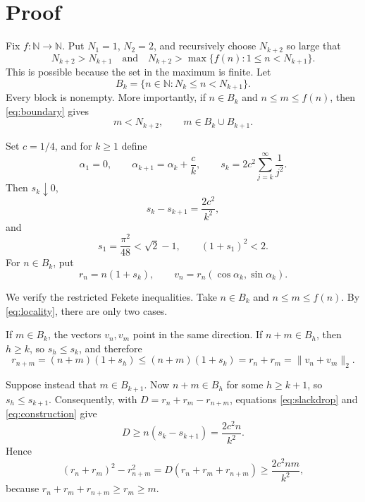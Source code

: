 \documentclass[11pt]{article}
\newcommand{\N}{\mathbb N}
\newcommand{\uu}[1]{(\cos #1,\sin #1)}
\begin{document}
\section*{Proof}

Fix \(f:\N\to\N\).  Put \(N_1=1\), \(N_2=2\), and recursively choose
\(N_{k+2}\) so large that
\begin{equation}\label{eq:boundary}
 N_{k+2}>N_{k+1}
 \quad\text{and}\quad
 N_{k+2}>\max\{f(n):1\leq n<N_{k+1}\}.
\end{equation}
This is possible because the set in the maximum is finite.  Let
\[
 B_k=\{n\in\N:N_k\leq n<N_{k+1}\}.
\]
Every block is nonempty.  More importantly, if \(n\in B_k\) and
\(n\leq m\leq f(n)\), then \eqref{eq:boundary} gives
\begin{equation}\label{eq:locality}
                  m<N_{k+2},\qquad m\in B_k\cup B_{k+1}.
\end{equation}

Set \(c=1/4\), and for \(k\geq1\) define
\begin{equation}\label{eq:parameters}
 \alpha_1=0,\qquad
 \alpha_{k+1}=\alpha_k+\frac{c}{k},
 \qquad
 s_k=2c^2\sum_{j=k}^{\infty}\frac1{j^2}.
\end{equation}
Then \(s_k\downarrow0\),
\begin{equation}\label{eq:slackdrop}
                s_k-s_{k+1}=\frac{2c^2}{k^2},
\end{equation}
and
\begin{equation}\label{eq:constant}
 s_1=\frac{\pi^2}{48}<\sqrt2-1,
 \qquad (1+s_1)^2<2.
\end{equation}
For \(n\in B_k\), put
\begin{equation}\label{eq:construction}
 r_n=n(1+s_k),
 \qquad
 v_n=r_n\uu{\alpha_k}.
\end{equation}

We verify the restricted Fekete inequalities.  Take
\(n\in B_k\) and \(n\leq m\leq f(n)\).  By
\eqref{eq:locality}, there are only two cases.

If \(m\in B_k\), the vectors \(v_n,v_m\) point in the same direction.  If
\(n+m\in B_h\), then \(h\geq k\), so \(s_h\leq s_k\), and therefore
\[
 r_{n+m}=(n+m)(1+s_h)\leq(n+m)(1+s_k)=r_n+r_m
          =\|v_n+v_m\|_2.
\]

Suppose instead that \(m\in B_{k+1}\).  Now \(n+m\in B_h\) for some
\(h\geq k+1\), so \(s_h\leq s_{k+1}\).  Consequently, with
\(D=r_n+r_m-r_{n+m}\), equations \eqref{eq:slackdrop} and
\eqref{eq:construction} give
\begin{equation}\label{eq:radial}
 D\geq n(s_k-s_{k+1})=\frac{2c^2n}{k^2}.
\end{equation}
Hence
\begin{equation}\label{eq:radialbudget}
 (r_n+r_m)^2-r_{n+m}^2
 =D(r_n+r_m+r_{n+m})
 \geq\frac{2c^2nm}{k^2},
\end{equation}
because \(r_n+r_m+r_{n+m}\geq r_m\geq m\).
\end{document}
